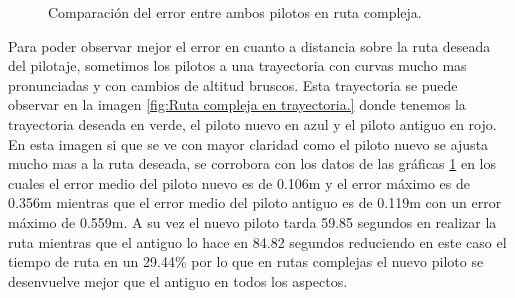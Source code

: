 \begin{figure}[H]
 \centering
 \caption{Comparación del error entre ambos pilotos en ruta compleja.}
 \label{f:Comparativa del error compleja.}
\end{figure} 

\hspace{1cm} Para poder observar mejor el error en cuanto a distancia sobre la ruta deseada del pilotaje, sometimos los pilotos a una trayectoria con curvas mucho mas pronunciadas y con cambios de altitud bruscos. Esta trayectoria se puede observar en la imagen \ref{fig:Ruta compleja en trayectoria.} donde tenemos la trayectoria deseada en verde, el piloto nuevo en azul y el piloto antiguo en rojo. En esta imagen si que se ve con mayor claridad como el piloto nuevo se ajusta mucho mas a la ruta deseada, se corrobora con los datos de las gráficas \ref{f:Comparativa del error compleja.} en los cuales el error medio del piloto nuevo es de 0.106m y el error máximo es de 0.356m mientras que el error medio del piloto antiguo es de 0.119m con un error máximo de 0.559m. A su vez el nuevo piloto tarda 59.85 segundos en realizar la ruta mientras que el antiguo lo hace en 84.82 segundos reduciendo en este caso el tiempo de ruta en un 29.44\% por lo que en rutas complejas el nuevo piloto se desenvuelve mejor que el antiguo en todos los aspectos.

